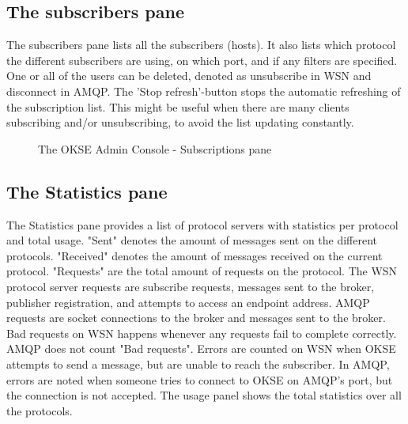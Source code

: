 \subsection{The subscribers pane}
The subscribers pane lists all the subscribers (hosts). It also lists which protocol the different subscribers are using, on which port, and if any filters are specified. One or all of the users can be deleted, denoted as unsubscribe in WSN and disconnect in AMQP. The 'Stop refresh'-button stops the automatic refreshing of the subscription list. This might be useful when there are many clients subscribing and/or unsubscribing, to avoid the list updating constantly.

\begin{center}
  \begin{figure}[ht!]
    \caption{The OKSE Admin Console - Subscriptions pane} 
    \label{fig:OKSE Admin Console - Subscriptions pane}
  \end{figure}
\end{center}

\subsection{The Statistics pane}
The Statistics pane provides a list of protocol servers with statistics per protocol and total usage. "Sent" denotes the amount of messages sent on the different protocols. "Received" denotes the amount of messages received on the current protocol. "Requests" are the total amount of requests on the protocol. The WSN protocol server requests are subscribe requests, messages sent to the broker, publisher registration, and attempts to access an endpoint address. AMQP requests are socket connections to the broker and messages sent to the broker. Bad requests on WSN happens whenever any requests fail to complete correctly. AMQP does not count "Bad requests". Errors are counted on WSN when OKSE attempts to send a message, but are unable to reach the subscriber. In AMQP, errors are noted when someone tries to connect to OKSE on AMQP's port, but the connection is not accepted. The usage panel shows the total statistics over all the protocols.

